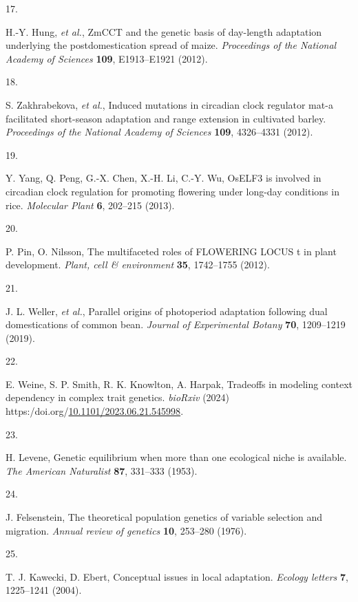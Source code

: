 \documentclass[
  9pt,
  twocolumn,
  twoside]{pnas-new}
\newlength{\cslhangindent}
\newlength{\csllabelwidth}
\newenvironment{CSLReferences}[2] %
 {\begin{list}{}{%
  \setlength{\itemindent}{0pt}
  \setlength{\leftmargin}{0pt}
  \setlength{\parsep}{0pt}
  \ifodd #1
   \setlength{\leftmargin}{\cslhangindent}
   \setlength{\itemindent}{-1\cslhangindent}
  \fi
  \setlength{\itemsep}{#2\baselineskip}}}
 {\end{list}}
\newcommand{\CSLLeftMargin}[1]{\parbox[t]{\csllabelwidth}{\strut#1\strut}}
\newcommand{\CSLRightInline}[1]{\parbox[t]{\linewidth - \csllabelwidth}{\strut#1\strut}}
\begin{document}
\begin{CSLReferences}{0}{1}
\CSLLeftMargin{17. }%
\CSLRightInline{H.-Y. Hung, \emph{et al.}, ZmCCT and the genetic basis
of day-length adaptation underlying the postdomestication spread of
maize. \emph{Proceedings of the National Academy of Sciences}
\textbf{109}, E1913--E1921 (2012).}

\CSLLeftMargin{18. }%
\CSLRightInline{S. Zakhrabekova, \emph{et al.}, Induced mutations in
circadian clock regulator mat-a facilitated short-season adaptation and
range extension in cultivated barley. \emph{Proceedings of the National
Academy of Sciences} \textbf{109}, 4326--4331 (2012).}

\CSLLeftMargin{19. }%
\CSLRightInline{Y. Yang, Q. Peng, G.-X. Chen, X.-H. Li, C.-Y. Wu, OsELF3
is involved in circadian clock regulation for promoting flowering under
long-day conditions in rice. \emph{Molecular Plant} \textbf{6}, 202--215
(2013).}

\CSLLeftMargin{20. }%
\CSLRightInline{P. Pin, O. Nilsson, The multifaceted roles of FLOWERING
LOCUS t in plant development. \emph{Plant, cell \& environment}
\textbf{35}, 1742--1755 (2012).}

\CSLLeftMargin{21. }%
\CSLRightInline{J. L. Weller, \emph{et al.}, Parallel origins of
photoperiod adaptation following dual domestications of common bean.
\emph{Journal of Experimental Botany} \textbf{70}, 1209--1219 (2019).}

\CSLLeftMargin{22. }%
\CSLRightInline{E. Weine, S. P. Smith, R. K. Knowlton, A. Harpak,
Tradeoffs in modeling context dependency in complex trait genetics.
\emph{bioRxiv} (2024)
https:/doi.org/\href{https://doi.org/10.1101/2023.06.21.545998}{10.1101/2023.06.21.545998}.}

\CSLLeftMargin{23. }%
\CSLRightInline{H. Levene, Genetic equilibrium when more than one
ecological niche is available. \emph{The American Naturalist}
\textbf{87}, 331--333 (1953).}

\CSLLeftMargin{24. }%
\CSLRightInline{J. Felsenstein, The theoretical population genetics of
variable selection and migration. \emph{Annual review of genetics}
\textbf{10}, 253--280 (1976).}

\CSLLeftMargin{25. }%
\CSLRightInline{T. J. Kawecki, D. Ebert, Conceptual issues in local
adaptation. \emph{Ecology letters} \textbf{7}, 1225--1241 (2004).}


\end{CSLReferences}
\end{document}
